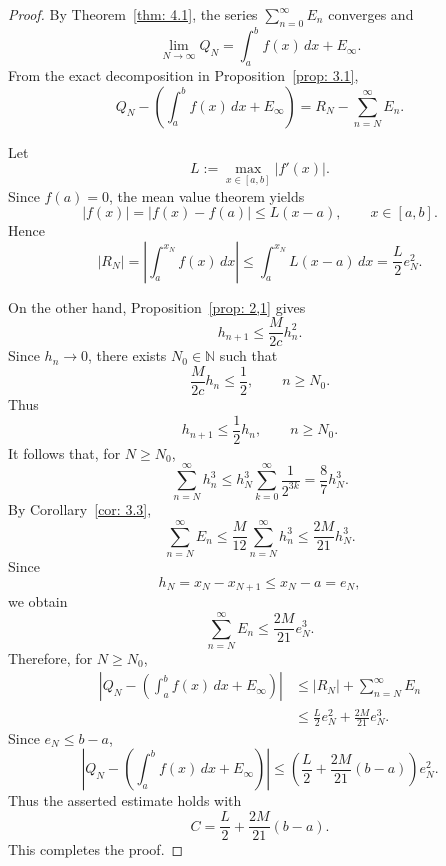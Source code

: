 \documentclass[10pt,a4paper]{amsart}
\begin{document}
\begin{proof}
By Theorem~\ref{thm: 4.1},
the series $\sum_{n=0}^{\infty}E_n$ converges and
\[
\lim_{N\to\infty}Q_N
=
\int_a^b f(x)\,dx+E_\infty.
\]
From the exact decomposition in Proposition~\ref{prop: 3.1},
\[
Q_N-
\left(
\int_a^b f(x)\,dx+E_\infty
\right)
=
R_N-\sum_{n=N}^{\infty}E_n.
\]

Let
\[
L:=\max_{x\in[a,b]}|f'(x)|.
\]
Since $f(a)=0$, the mean value theorem yields
\[
|f(x)|
=
|f(x)-f(a)|
\leq L(x-a),
\qquad x\in[a,b].
\]
Hence
\[
|R_N|
=
\left|\int_a^{x_N}f(x)\,dx\right|
\leq
\int_a^{x_N}L(x-a)\,dx
=
\frac{L}{2}e_N^2.
\]

On the other hand, Proposition~\ref{prop: 2,1} gives
\[
h_{n+1}\leq \frac{M}{2c}h_n^2.
\]
Since $h_n\to0$, there exists $N_0\in\mathbb{N}$ such that
\[
\frac{M}{2c}h_n\leq\frac12,
\qquad n\geq N_0.
\]
Thus
\[
h_{n+1}\leq\frac12h_n,
\qquad n\geq N_0.
\]
It follows that, for $N\geq N_0$,
\[
\sum_{n=N}^{\infty}h_n^3
\leq
h_N^3\sum_{k=0}^{\infty}\frac{1}{2^{3k}}
=
\frac{8}{7}h_N^3.
\]
By Corollary~\ref{cor: 3.3},
\[
\sum_{n=N}^{\infty}E_n
\leq
\frac{M}{12}\sum_{n=N}^{\infty}h_n^3
\leq
\frac{2M}{21}h_N^3.
\]
Since
\[
h_N=x_N-x_{N+1}\leq x_N-a=e_N,
\]
we obtain
\[
\sum_{n=N}^{\infty}E_n
\leq
\frac{2M}{21}e_N^3.
\]
Therefore, for $N\geq N_0$,
\[
\begin{aligned}
\left|
Q_N-
\left(
\int_a^b f(x)\,dx+E_\infty
\right)
\right|
&\leq
|R_N|+\sum_{n=N}^{\infty}E_n\\
&\leq
\frac{L}{2}e_N^2
+
\frac{2M}{21}e_N^3.
\end{aligned}
\]
Since $e_N\leq b-a$,
\[
\left|
Q_N-
\left(
\int_a^b f(x)\,dx+E_\infty
\right)
\right|
\leq
\left(
\frac{L}{2}
+
\frac{2M}{21}(b-a)
\right)e_N^2.
\]
Thus the asserted estimate holds with
\[
C=
\frac{L}{2}
+
\frac{2M}{21}(b-a).
\]
This completes the proof.
\end{proof}
\end{document}
